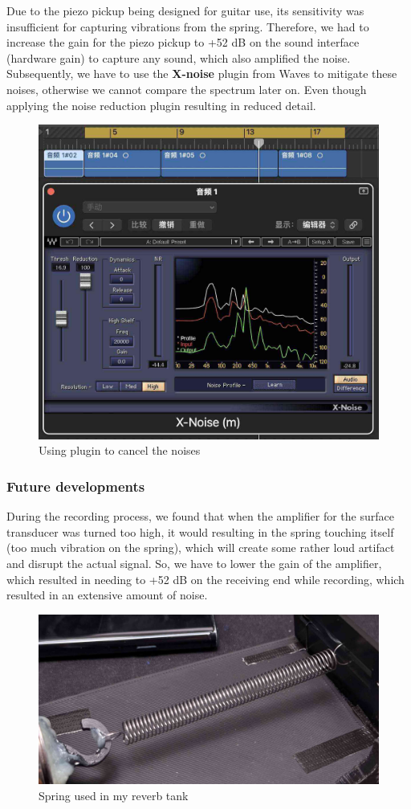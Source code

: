 \documentclass[12pt]{article}
\begin{document}
Due to the piezo pickup being designed for guitar use, its sensitivity was insufficient for capturing vibrations from the spring. Therefore, we had to increase the gain for the piezo pickup to +52 dB on the sound interface (hardware gain) to capture any sound, which also amplified the noise. Subsequently, we have to use the \textbf{X-noise} plugin from Waves to mitigate these noises, otherwise we cannot compare the spectrum later on. Even though applying the noise reduction plugin resulting in reduced detail.

\begin{figure}[h]
\center
	\includegraphics[width=0.5\linewidth]{xnoise.jpg}
	\caption{Using plugin to cancel the noises}
\end{figure}

\subsubsection{Future developments}

During the recording process, we found that when the amplifier for the surface transducer was turned too high, it would resulting in the spring touching itself (too much vibration on the spring), which will create some rather loud artifact and disrupt the actual signal. So, we have to lower the gain of the amplifier, which resulted in needing to +52 dB on the receiving end while recording, which resulted in an extensive amount of noise.

\begin{figure}[h] 
	\center 
	\includegraphics[width=0.5\linewidth]{spring.jpg} 
	\caption{Spring used in my reverb tank} 
\end{figure} 
\end{document}
